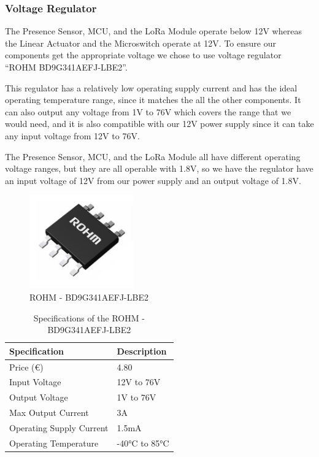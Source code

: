 \documentclass[12pt,a4paper]{article}
\begin{document}
\subsubsection{Voltage Regulator}
The Presence Sensor, MCU, and the LoRa Module operate below 12V whereas the Linear Actuator and the Microswitch operate at 12V. To ensure our components get the appropriate voltage we chose to use voltage regulator “ROHM BD9G341AEFJ-LBE2”. 

This regulator has a relatively low operating supply current and has the ideal operating temperature range, since it matches the all the other components. It can also output any voltage from 1V to 76V which covers the range that we would need, and it is also compatible with our 12V power supply since it can take any input voltage from 12V to 76V. 

The Presence Sensor, MCU, and the LoRa Module all have different operating voltage ranges, but they are all operable with 1.8V, so we have the regulator have an input voltage of 12V from our power supply and an output voltage of 1.8V. 
\begin{figure}[h]
    \centering
    \includegraphics[width=0.4\textwidth]{images/Voltage_Reg.png}
    \caption{ROHM - BD9G341AEFJ-LBE2 \cite{voltage_regulator}}
\end{figure}

\begin{table}[h]
    \centering
    \begin{tabular}{|l|l|}
    \hline
    \textbf{Specification} & \textbf{Description} \\ \hline
    Price (€)              & 4.80                 \\ \hline
    Input Voltage          & 12V to 76V           \\ \hline
    Output Voltage         & 1V to 76V            \\ \hline
    Max Output Current     & 3A                   \\ \hline
    Operating Supply Current & 1.5mA              \\ \hline
    Operating Temperature  & -40°C to 85°C        \\ \hline
    \end{tabular}
    \caption{Specifications of the ROHM - BD9G341AEFJ-LBE2}
    \label{tab:rohm_bd9g341aefj_lbe2}
    \end{table}
\end{document}

